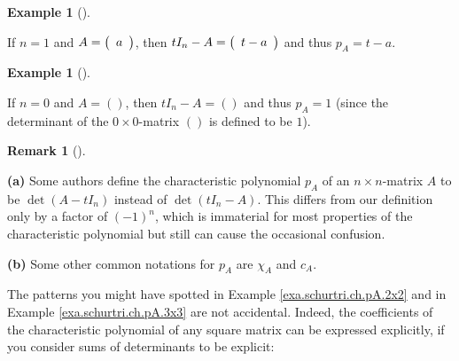 \documentclass[numbers=enddot,12pt,final,onecolumn,notitlepage]{scrartcl}%
\numberwithin{exer}{subsection}
\theoremstyle{definition}
\newtheorem{remk}[theo]{Remark}
\newenvironment{remark}[1][]
{\begin{remk}[#1]\begin{leftbar}}
{\end{leftbar}\end{remk}}
\newtheorem{exam}[theo]{Example}
\newenvironment{example}[1][]
{\begin{exam}[#1]\begin{leftbar}}
{\end{leftbar}\end{exam}}
\begin{document}
\begin{example}
If $n=1$ and $A=\left(
\begin{array}
[c]{c}%
a
\end{array}
\right)  $, then $tI_{n}-A=\left(
\begin{array}
[c]{c}%
t-a
\end{array}
\right)  $ and thus $p_{A}=t-a$.
\end{example}

\begin{example}
If $n=0$ and $A=\left(  {}\right)  $, then $tI_{n}-A=\left(  {}\right)  $ and
thus $p_{A}=1$ (since the determinant of the $0\times0$-matrix $\left(
{}\right)  $ is defined to be $1$).
\end{example}

\begin{remark}
\label{rmk.schurtri.ch.conventions}\textbf{(a)} Some authors define the
characteristic polynomial $p_{A}$ of an $n\times n$-matrix $A$ to be
$\det\left(  A-tI_{n}\right)  $ instead of $\det\left(  tI_{n}-A\right)  $.
This differs from our definition only by a factor of $\left(  -1\right)  ^{n}%
$, which is immaterial for most properties of the characteristic polynomial
but still can cause the occasional confusion. \medskip

\textbf{(b)} Some other common notations for $p_{A}$ are $\chi_{A}$ and
$c_{A}$.
\end{remark}

The patterns you might have spotted in Example \ref{exa.schurtri.ch.pA.2x2}
and in Example \ref{exa.schurtri.ch.pA.3x3} are not accidental. Indeed, the
coefficients of the characteristic polynomial of any square matrix can be
expressed explicitly, if you consider sums of determinants to be explicit:
\end{document}
